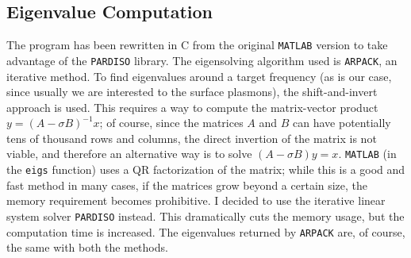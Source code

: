 \documentclass[11pt,a4paper,oneside]{article}
\begin{document}
\subsection{Eigenvalue Computation}
The program has been rewritten in C from the original {\tt MATLAB} version to take advantage of the {\tt PARDISO} library. The eigensolving algorithm used is {\tt ARPACK}, an iterative method. To find eigenvalues around a target frequency (as is our case, since usually we are interested to the surface plasmons), the shift-and-invert approach is used. This requires a way to compute the matrix-vector product $y = (A - \sigma B)^{-1} x$; of course, since the matrices $A$ and $B$ can have potentially tens of thousand rows and columns, the direct invertion of the matrix is not viable, and therefore an alternative way is to solve $(A - \sigma B) y = x$. {\tt MATLAB} (in the {\tt eigs} function) uses a QR factorization of the matrix; while this is a good and fast method in many cases, if the matrices grow beyond a certain size, the memory requirement becomes prohibitive. I decided to use the iterative linear system solver {\tt PARDISO} instead. This dramatically cuts the memory usage, but the computation time is increased. The eigenvalues returned by {\tt ARPACK} are, of course, the same with both the methods.
\end{document}
